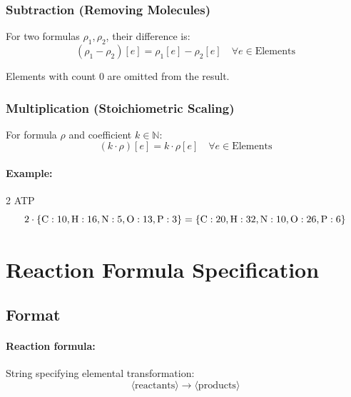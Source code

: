 \subsubsection{Subtraction (Removing Molecules)}

For two formulas $\rho_1, \rho_2$, their difference is:
\begin{equation}
(\rho_1 - \rho_2)[e] = \rho_1[e] - \rho_2[e] \quad \forall e \in \text{Elements}
\end{equation}

Elements with count 0 are omitted from the result.

\subsubsection{Multiplication (Stoichiometric Scaling)}

For formula $\rho$ and coefficient $k \in \mathbb{N}$:
\begin{equation}
(k \cdot \rho)[e] = k \cdot \rho[e] \quad \forall e \in \text{Elements}
\end{equation}

\paragraph{Example:} 2 ATP
\begin{equation}
2 \cdot \{\ce{C}: 10, \ce{H}: 16, \ce{N}: 5, \ce{O}: 13, \ce{P}: 3\} = \{\ce{C}: 20, \ce{H}: 32, \ce{N}: 10, \ce{O}: 26, \ce{P}: 6\}
\end{equation}

\section{Reaction Formula Specification}
\label{sec:reaction-formulas}

\subsection{Format}
\label{subsec:reaction-format}

\paragraph{Reaction formula:} String specifying elemental transformation:
\begin{equation}
\langle\text{reactants}\rangle \to \langle\text{products}\rangle
\end{equation}

